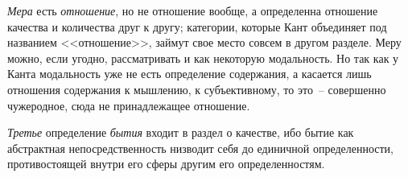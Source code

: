 \emph{Мера} есть \emph{отношение}, но не отношение вообще,
а определенна отношение качества и количества друг
к другу; категории, которые Кант объединяет под названием
<<отношение>>, займут свое место совсем в другом
разделе. Меру можно, если угодно, рассматривать и как
некоторую модальность. Но так как у Канта модальность
уже не есть определение содержания, а касается лишь
отношения содержания к мышлению, к субъективному,
то это~-- совершенно чужеродное, сюда не принадлежащее
отношение.

\emph{Третье} определение \emph{бытия} входит в раздел о качестве,
ибо бытие как абстрактная непосредственность низводит
себя до единичной определенности, противостоящей
внутри его сферы другим его определенностям.




